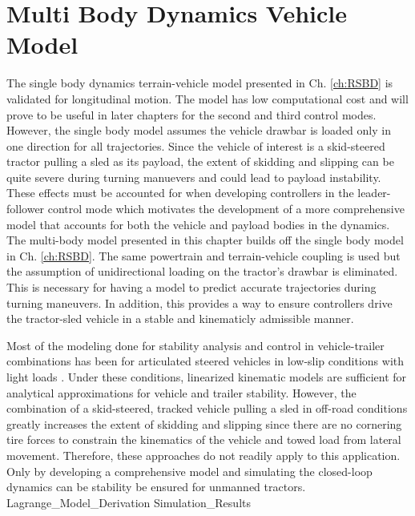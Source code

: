 \chapter{Multi Body Dynamics Vehicle Model}\label{ch:RMBD}
The single body dynamics terrain-vehicle model presented in Ch. \ref{ch:RSBD} is validated for longitudinal motion. The model has low computational cost and will prove to be useful in later chapters for the second and third control modes. However, the single body model assumes the vehicle drawbar is loaded only in one direction for all trajectories. Since the vehicle of interest is a skid-steered tractor pulling a sled as its payload, the extent of skidding and slipping can be quite severe during turning manuevers and could lead to payload instability. These effects must be accounted for when developing controllers in the leader-follower control mode which motivates the development of a more comprehensive model that accounts for both the vehicle and payload bodies in the dynamics. The multi-body model presented in this chapter builds off the single body model in Ch. \ref{ch:RSBD}. The same powertrain and terrain-vehicle coupling is used but the assumption of unidirectional loading on the tractor's drawbar is eliminated. This is necessary for having a model to predict accurate trajectories during turning maneuvers. In addition, this provides a way to ensure controllers drive the tractor-sled vehicle in a stable and kinematicly admissible manner.

Most of the modeling done for stability analysis and control in vehicle-trailer combinations has been for articulated steered vehicles in low-slip conditions with light loads \cite{kang2007vehicle}. Under these conditions, linearized kinematic models are sufficient for analytical approximations for vehicle and trailer stability. However, the combination of a skid-steered, tracked vehicle pulling a sled in off-road conditions greatly increases the extent of skidding and slipping since there are no cornering tire forces to constrain the kinematics of the vehicle and towed load from lateral movement. Therefore, these approaches do not readily apply to this application. Only by developing a comprehensive model and simulating the closed-loop dynamics can be stability be ensured for unmanned tractors.  
{Lagrange_Model_Derivation}
{Simulation_Results}